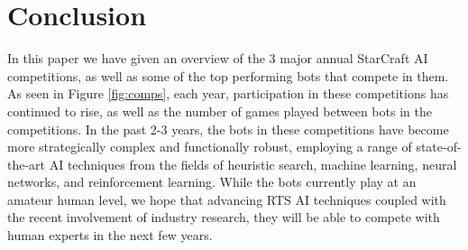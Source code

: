 \section{Conclusion}\label{secConclusion}

In this paper we have given an overview of the 3 major annual StarCraft AI competitions, as well as some of the top performing bots that compete in them. As seen in Figure \ref{fig:comps}, each year, participation in these competitions has continued to rise, as well as the number of games played between bots in the competitions. In the past 2-3 years, the bots in these competitions have become more strategically complex and functionally robust, employing a range of state-of-the-art AI techniques from the fields of heuristic search, machine learning, neural networks, and reinforcement learning. While the bots currently play at an amateur human level, we hope that advancing RTS AI techniques coupled with the recent involvement of industry research, they will be able to compete with human experts in the next few years.